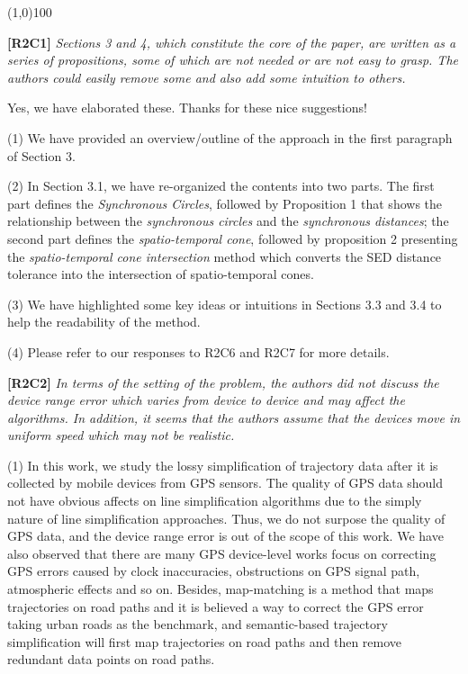 \documentclass{letter}
\begin{document}
\line(1,0){100}

\textbf{[R2C1]} \emph{Sections 3 and 4, which constitute the core of the paper, are written as a series of propositions, some of which are not needed or are not easy to grasp. The authors could easily remove some and also add some intuition to others.}

Yes, we have elaborated these. Thanks for these nice suggestions!

(1) We have provided an overview/outline of the approach in the first paragraph of Section 3.

(2) In Section 3.1, we have re-organized the contents into two parts. The first part defines the \emph{Synchronous Circles}, followed by Proposition 1 that shows the relationship between the \textit{synchronous circles} and the \textit{synchronous distances}; the second part defines the \textit{spatio-temporal cone}, followed by proposition 2 presenting the \textit{spatio-temporal cone intersection} method which converts the SED distance tolerance into the intersection of spatio-temporal cones.

(3) We have highlighted some key ideas or intuitions in Sections 3.3 and 3.4 to help the readability of the method.


(4) Please refer to our responses to R2C6 and R2C7 for more details.

\textbf{[R2C2]} \emph{In terms of the setting of the problem, the authors did not discuss the device range error which varies from device to device and may affect the algorithms.
In addition, it seems that the authors assume that the devices move in uniform speed which may not be realistic.
}

(1) In this work, we study the lossy simplification of trajectory data after it is collected by mobile devices from GPS sensors. The quality of GPS data should not have obvious affects on line simplification algorithms due to the simply nature of line simplification approaches. Thus, we do not surpose the quality of GPS data, and the device range error is out of the scope of this work. 
%
We have also observed that there are many GPS device-level works focus on correcting GPS errors caused by clock inaccuracies, obstructions on GPS signal path, atmospheric effects and so on. Besides, map-matching is a method that maps trajectories on road paths and it is believed a way to correct the GPS error taking urban roads as the benchmark, and semantic-based trajectory simplification will first map trajectories on road paths and then remove redundant data points on road paths.  
\end{document}
